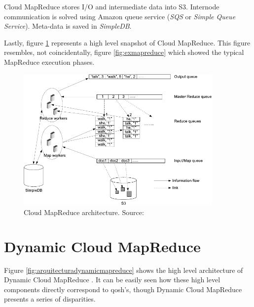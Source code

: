 Cloud MapReduce stores I/O and intermediate data into S3. Internode communication is solved using Amazon queue service (\emph{SQS} or \emph{Simple Queue Service}). Meta-data is saved in \emph{SimpleDB}.

Lastly, figure \ref{fig:arquitecturacloudmapreduce} represents a high level snapshot of Cloud MapReduce. This figure resembles, not coincidentally, figure \ref{fig:exmapreduce} which showed the typical MapReduce execution phases.

\begin{figure}[tbp]
\begin{center}
\includegraphics[width=0.9\textwidth]{imagenes/036.pdf}
 \caption{Cloud MapReduce architecture. Source: \cite{cloudmapreduce}}
\label{fig:arquitecturacloudmapreduce}
\end{center}
\end{figure}

\section{Dynamic Cloud MapReduce}\label{sec:dynamicmapreduce}
\noindent Figure \ref{fig:arquitecturadynamicmapreduce} shows the high level architecture of Dynamic Cloud MapReduce \cite{dynamicmapreduce}. It can be easily seen how these high level components directly correspond to qosh's, though Dynamic Cloud MapReduce presents a series of disparities.

